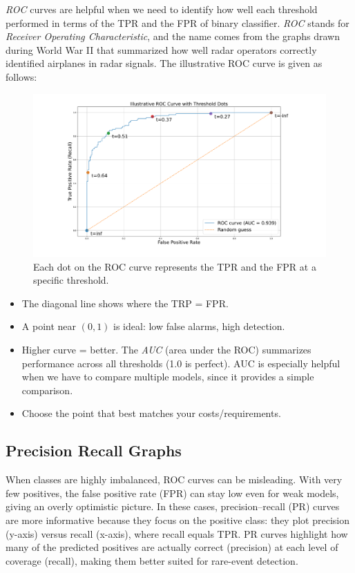 \textit{ROC} curves are helpful when we need to identify how well each threshold performed in terms of the TPR and the FPR of binary classifier. \textit{ROC} stands for \textit{Receiver Operating Characteristic}, and the name comes from the graphs drawn during World War II that summarized how well radar operators correctly identified airplanes in radar signals. The illustrative ROC curve is given as follows:

\begin{figure}[h]
	\centering
	\includegraphics[scale=0.3]{./images/evaluation_metrics/roc_curve.pdf}
	\caption{Each dot on the ROC curve represents the TPR and the FPR at a specific threshold.}
\end{figure}
\begin{itemize}
	\item The diagonal line shows where the TRP = FPR.
	\item A point near $(0,1)$ is ideal: low false alarms, high detection.
	\item Higher curve = better. The \textit{AUC} (area under the ROC) summarizes performance across all thresholds (1.0 is perfect). AUC is especially helpful when we have to compare multiple models, since it provides a simple comparison. 
	\item Choose the point that best matches your costs/requirements.
\end{itemize}

\subsection{Precision Recall Graphs}

When classes are highly imbalanced, ROC curves can be misleading. With very few positives, the false positive rate (FPR) can stay low even for weak models, giving an overly optimistic picture. In these cases, precision–recall (PR) curves are more informative because they focus on the positive class: they plot precision (y-axis) versus recall (x-axis), where recall equals TPR. PR curves highlight how many of the predicted positives are actually correct (precision) at each level of coverage (recall), making them better suited for rare-event detection.

